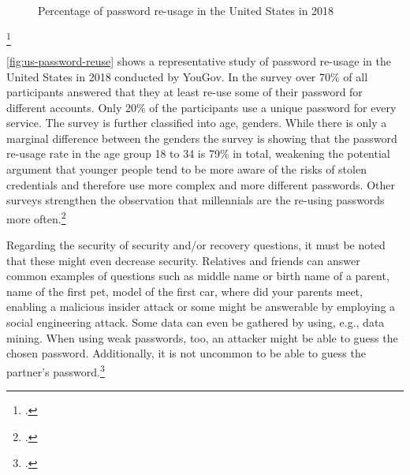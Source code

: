 \newpage


\begin{figure}
	\begin{bchart}[min=5, max=55, step=10, unit=\%]
		\medskip
		\medskip
		\bigskip
		\bigskip
	\end{bchart}
	\caption[Percentage of password re-usage in the United States in 2018]{Percentage of password re-usage in the United States in 2018\footnotemark}
	\label{fig:us-password-reuse}
\end{figure}
\footcitetext[Source:][8]{yougov}

\autoref{fig:us-password-reuse} shows a representative study of password re-usage in the United States in 2018 conducted by YouGov. In the survey over 70\% of all participants answered that they at least re-use some of their password for different accounts. Only 20\% of the participants use a unique password for every service. The survey is further classified into age, genders. While there is only a marginal difference between the genders the survey is showing that the password re-usage rate in the age group 18 to 34 is 79\% in total, weakening the potential argument that younger people tend to be more aware of the risks of stolen credentials and therefore use more complex and more different passwords. Other surveys strengthen the observation that millennials are the re-using passwords more often.\footcites[See][10]{ibm-security}[See][8]{yougov}[See][11]{lastpass}

Regarding the security of security and/or recovery questions, it must be noted that these might even decrease security. Relatives and friends can answer common examples of questions such as \frqq middle name or birth name of a parent, name of the first pet, model of the first car, where did your parents meet\flqq{}, enabling a malicious insider attack or some might be answerable by employing a social engineering attack. Some data can even be gathered by using, e.g., data mining. When using weak passwords, too, an attacker might be able to guess the chosen password. Additionally, it is not uncommon to be able to guess the partner's password.\footcites[See][11]{lastpass}[See][169]{Brainard2006}[See][]{Bonneau:2015:SLA:2736277.2741691}

